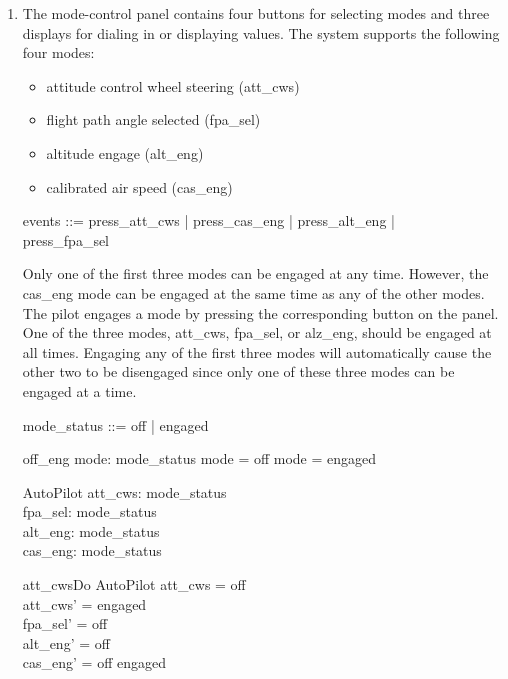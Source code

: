 \documentclass{article}
\begin{document}
\begin{enumerate}
\item The mode-control panel contains four buttons for selecting modes and three displays for
dialing in or displaying values. The system supports the following four modes:

\begin{itemize}
\item attitude control wheel steering (att\_cws)
\item flight path angle selected (fpa\_sel)
\item altitude engage (alt\_eng)
\item calibrated air speed (cas\_eng)
\end{itemize}

\begin{zed}
{\color{set}events ::= press\_att\_cws |  press\_cas\_eng | press\_alt\_eng |} \\
{\color{set}press\_fpa\_sel}
\end{zed}

Only one of the first three modes can be engaged at any time. However, the cas\_eng mode
can be engaged at the same time as any of the other modes. The pilot engages a mode by pressing
the corresponding button on the panel. One of the three modes, att\_cws, fpa\_sel, or alz\_eng,
should be engaged at all times. Engaging any of the first three modes will automatically cause the
other two to be disengaged since only one of these three modes can be engaged at a time.

\begin{zed}
{\color{set}mode\_status ::= off | engaged}
\end{zed}

{\color{set}\begin{schema}{off\_eng}
mode: mode\_status
\where
mode = off \lor mode = engaged
\end{schema}}

{\color{set}\begin{schema}{AutoPilot}
att\_cws: mode\_status \\
fpa\_sel: mode\_status \\
alt\_eng: mode\_status \\
cas\_eng: mode\_status
\end{schema}}

{\color{set}\begin{schema}{att\_cwsDo}
\Delta AutoPilot 
\where
att\_cws = off \\
att\_cws' = engaged \\
fpa\_sel' = off \\
alt\_eng' = off \\
cas\_eng' = off \lor engaged \\
\end{schema}}


\end{enumerate}
\end{document}
